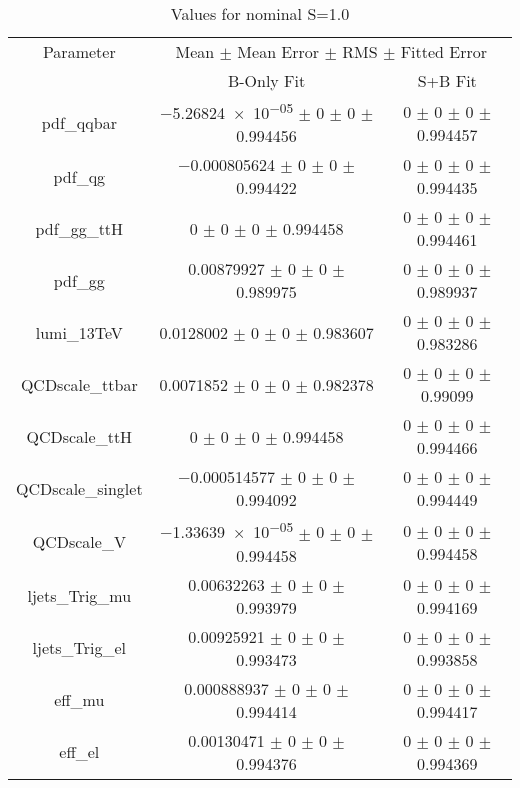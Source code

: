 \begin{table}
\centering
\caption{Values for nominal S=1.0}
\begin{tabular}{ccc}
\toprule
Parameter 	& \multicolumn{2}{c}{Mean $\pm$ Mean Error $\pm$ RMS $\pm$ Fitted Error}\\
 	& B-Only Fit & S+B Fit\\
\midrule
pdf\_qqbar 	& \num{-5.26824e-05} $\pm$ \num{0} $\pm$ \num{0} $\pm$ \num{0.994456} 	& \num{0} $\pm$ \num{0} $\pm$ \num{0} $\pm$ \num{0.994457}\\
pdf\_qg 	& \num{-0.000805624} $\pm$ \num{0} $\pm$ \num{0} $\pm$ \num{0.994422} 	& \num{0} $\pm$ \num{0} $\pm$ \num{0} $\pm$ \num{0.994435}\\
pdf\_gg\_ttH 	& \num{0} $\pm$ \num{0} $\pm$ \num{0} $\pm$ \num{0.994458} 	& \num{0} $\pm$ \num{0} $\pm$ \num{0} $\pm$ \num{0.994461}\\
pdf\_gg 	& \num{0.00879927} $\pm$ \num{0} $\pm$ \num{0} $\pm$ \num{0.989975} 	& \num{0} $\pm$ \num{0} $\pm$ \num{0} $\pm$ \num{0.989937}\\
lumi\_13TeV 	& \num{0.0128002} $\pm$ \num{0} $\pm$ \num{0} $\pm$ \num{0.983607} 	& \num{0} $\pm$ \num{0} $\pm$ \num{0} $\pm$ \num{0.983286}\\
QCDscale\_ttbar 	& \num{0.0071852} $\pm$ \num{0} $\pm$ \num{0} $\pm$ \num{0.982378} 	& \num{0} $\pm$ \num{0} $\pm$ \num{0} $\pm$ \num{0.99099}\\
QCDscale\_ttH 	& \num{0} $\pm$ \num{0} $\pm$ \num{0} $\pm$ \num{0.994458} 	& \num{0} $\pm$ \num{0} $\pm$ \num{0} $\pm$ \num{0.994466}\\
QCDscale\_singlet 	& \num{-0.000514577} $\pm$ \num{0} $\pm$ \num{0} $\pm$ \num{0.994092} 	& \num{0} $\pm$ \num{0} $\pm$ \num{0} $\pm$ \num{0.994449}\\
QCDscale\_V 	& \num{-1.33639e-05} $\pm$ \num{0} $\pm$ \num{0} $\pm$ \num{0.994458} 	& \num{0} $\pm$ \num{0} $\pm$ \num{0} $\pm$ \num{0.994458}\\
ljets\_Trig\_mu 	& \num{0.00632263} $\pm$ \num{0} $\pm$ \num{0} $\pm$ \num{0.993979} 	& \num{0} $\pm$ \num{0} $\pm$ \num{0} $\pm$ \num{0.994169}\\
ljets\_Trig\_el 	& \num{0.00925921} $\pm$ \num{0} $\pm$ \num{0} $\pm$ \num{0.993473} 	& \num{0} $\pm$ \num{0} $\pm$ \num{0} $\pm$ \num{0.993858}\\
eff\_mu 	& \num{0.000888937} $\pm$ \num{0} $\pm$ \num{0} $\pm$ \num{0.994414} 	& \num{0} $\pm$ \num{0} $\pm$ \num{0} $\pm$ \num{0.994417}\\
eff\_el 	& \num{0.00130471} $\pm$ \num{0} $\pm$ \num{0} $\pm$ \num{0.994376} 	& \num{0} $\pm$ \num{0} $\pm$ \num{0} $\pm$ \num{0.994369}\\

\end{tabular}
\end{table}
